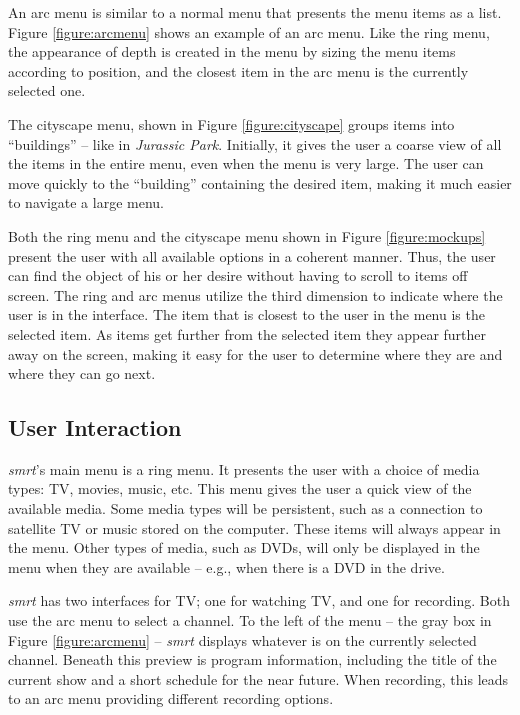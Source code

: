\documentclass[letterpaper, twoside, titlepage, 11pt]{article}
\begin{document}
An arc menu is similar to a normal menu that presents the menu items as a list.
Figure \ref{figure:arcmenu} shows an example of an arc menu. Like the ring menu,
the appearance of depth is created in the menu by sizing the menu items
according to position, and the closest item in the arc menu is the currently
selected one.

The cityscape menu, shown in Figure \ref{figure:cityscape} groups items into
``buildings'' -- like in \textit{Jurassic Park}. Initially, it gives the user a
coarse view of all the items in the entire menu, even when the menu is very
large.  The user can move quickly to the ``building'' containing the desired
item, making it much easier to navigate a large menu.

Both the ring menu and the cityscape menu shown in Figure \ref{figure:mockups}
present the user with all available options in a coherent manner. Thus, the user
can find the object of his or her desire without having to scroll to items off
screen.  The ring and arc menus utilize the third dimension to indicate where
the user is in the interface. The item that is closest to the user in the menu
is the selected item. As items get further from the selected item they appear
further away on the screen, making it easy for the user to determine where they
are and where they can go next.

\subsection{User Interaction}
\textit{smrt}'s main menu is a ring menu. It presents the user with a
choice of media types: TV, movies, music, etc. This menu gives the user a quick
view of the available media. Some media types will be persistent, such as a
connection to satellite TV or music stored on the computer. These items will
always appear in the menu. Other types of media, such as DVDs, will only be
displayed in the menu when they are available -- e.g., when there is a DVD in
the drive.

\textit{smrt} has two interfaces for TV; one for watching TV, and one for recording.
Both use the arc menu to select a channel.  To the left of the menu -- the gray box
in Figure \ref{figure:arcmenu} -- \textit{smrt} displays whatever is on the currently
selected channel.  Beneath this preview is program information, including the title
of the current show and a short schedule for the near future.  When recording, this
leads to an arc menu providing different recording options.
\end{document}

